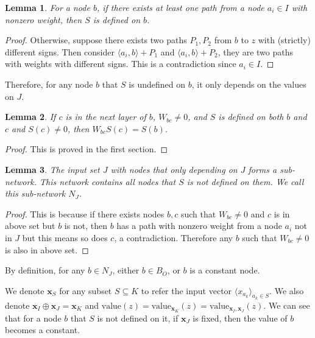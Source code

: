 \documentclass[]{article}
\newtheorem{lemma}{Lemma}
\theoremstyle{definition}
\newcommand{\Val}{\mathrm{value}}
\begin{document}
			\begin{lemma}\label{lem:sign}
				For a node $b$, if there exists at least one path from a node $a_i\in I$ with nonzero weight, then  $S$ is defined on $b$.
			\end{lemma}
			
			\begin{proof}
				Otherwise, suppose there exists two paths $P_1,P_2$ from $b$ to $z$ with (strictly) different signs. Then consider $\langle a_i,b\rangle+P_1$ and $\langle a_i,b\rangle+P_2$, they are two paths with weights with different signs. This is a contradiction since $a_i\in I$.
			\end{proof}
			Therefore, for any node $b$  that $S$ is undefined on $b$, it only depends on the values on $J$.  
			
			\begin{lemma}
				If $c$ is in the next layer of $b$, $W_{bc}\neq 0$, and $S$ is defined on both $b$ and $c$ and $S(c)\neq 0$, then $W_{bc}S(c)=S(b)$.
			\end{lemma}
			
			\begin{proof}
				This is proved in the first section.
			\end{proof}
			
			\begin{lemma}\label{lem:subnetwork2}
				The input set $J$ with nodes that only depending on $J$ forms a sub-network. This network contains all nodes that $S$ is not defined on them. We call this sub-network $N_J$.
			\end{lemma}
			
			\begin{proof}
				This is because if there exists nodes $b,c$ such that $W_{bc}\neq 0$ and $c$ is in above set but $b$ is not, then $b$ has a path with nonzero weight from a node $a_i$ not in $J$ but this means so does $c$, a contradiction. Therefore any $b$ such that $W_{bc}\neq 0$ is also in above set.
			\end{proof}
			
			By definition, for any $b\in N_J$, either $b\in B_O$, or $b$ is a constant node.
			
			We denote $\boldsymbol{x}_S$ for any subset $S\subseteq K$ to refer the input vector $\langle x_{a_k}\rangle_{a_k\in S}$. We also denote $\boldsymbol{x}_I\oplus \boldsymbol{x}_J = \boldsymbol{x}_K$ and $\Val(z)=\Val_{\boldsymbol{x}_K}(z)=\Val_{\boldsymbol{x}_I,\boldsymbol{x}_J} (z)$. We can see that for a node $b$ that $S$ is not defined on it, if $\boldsymbol{x}_J$ is fixed, then the value of $b$ becomes a constant.
			
\end{document}
